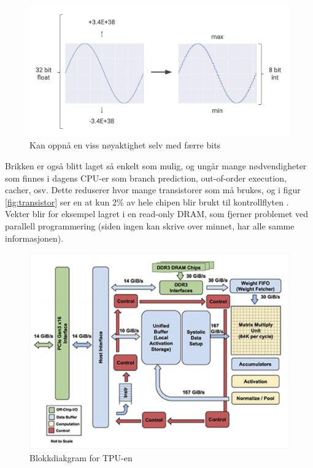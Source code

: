 \begin{figure}[t]
    \centering
    \includegraphics[width=\textwidth]{images/quantization.png}
    \caption{Kan oppnå en viss nøyaktighet selv med færre bits}
    \label{fig:quant}
\end{figure}

Brikken er også blitt laget så enkelt som mulig, og ungår mange nødvendigheter som finnes i dagens CPU-er som branch prediction, out-of-order execution, cacher, osv. Dette reduserer hvor mange transistorer som må brukes, og  i figur \ref{fig:transistor} ser en at kun 2\% av hele chipen blir brukt til kontrollflyten \cite{tpu_main}. Vekter blir for eksempel lagret i en read-only DRAM, som fjerner problemet ved parallell programmering (siden ingen kan skrive over minnet, har alle samme informasjonen).

\begin{figure}[ht]
    \centering
    \includegraphics[width=\textwidth]{images/tpu_block.jpg}
    \caption{Blokkdiakgram for TPU-en}
    \label{fig:blokk}
\end{figure}


